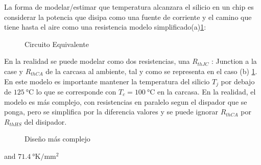 
La forma de modelar/estimar que temperatura alcanzara el silicio en un chip es considerar
la potencia que disipa como una fuente de corriente y el camino que tiene hasta el aire como
una resistencia modelo simplificado(a)\ref{fig:ThermalEquivalent}:

\begin{figure}[H]
    \centering
    
    \caption{Circuito Equivalente}
    \label{fig:ThermalEquivalent}
\end{figure}

En la realidad se puede modelar como dos resistencias, una $R_{thJC}$ : Junction a la case y $R_{thCA}$ de la carcasa al ambiente,
tal y como se representa en el caso (b) \ref{fig:ThermalEquivalent}.
En este modelo es importante mantener la temperatura del silicio $T_j$ por debajo de $\SI{125}{\celsius}$ lo que se corresponde con $T_c=\SI{100}{\celsius}$ en la carcasa. En la realidad, el modelo es más complejo, con resistencias en paralelo segun el dispador que se ponga, pero se simplifica por la diferencia valores y se puede ignorar $R_{thCA}$ por $R_{thHS}$ del disipador. 

\begin{figure}[H]
    \centering
    
    \caption{Diseño más complejo}
    \label{fig:ThermalEquivFull}
\end{figure}

and $\SI{71.4}{\degree\kelvin\per\square\mm}$